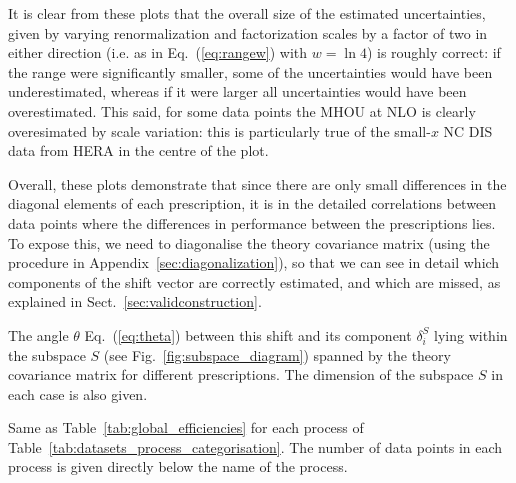 It is clear from these plots that the overall size of the estimated uncertainties, given by varying renormalization and factorization scales by a factor of two in either direction (i.e. as in 
Eq.~(\ref{eq:rangew}) with $w = \ln 4$) is roughly correct: if the range were significantly smaller, some of the uncertainties would have been underestimated, whereas if it were larger all uncertainties would have been overestimated. This said, for some data points the MHOU at NLO is clearly overesimated by scale variation: this is particularly true of the small-$x$ NC DIS data from HERA in the centre of the plot.
  
Overall, these plots demonstrate that since there are only small differences in the diagonal elements of each prescription, it is in the detailed correlations between data points where the differences in
performance between the prescriptions lies. To expose this, we need to diagonalise the theory covariance matrix (using the procedure in Appendix~\ref{sec:diagonalization}), so that we can see in detail which components of the shift vector are correctly estimated, and which are missed, as explained in Sect.~\ref{sec:validconstruction}. 


\begin{table}[ht!]
	\centering
	
        \vspace{5mm}
	\caption{\small The angle $\theta$  Eq.~(\ref{eq:theta}) between this
          shift and its component $\delta_i^S$ lying within the
          subspace $S$ (see Fig.~\ref{fig:subspace_diagram})
          spanned by the theory covariance matrix for  different
          prescriptions. The dimension of the subspace $S$ in each case
          is also given.}
	\label{tab:global_efficiencies}
\end{table}

\begin{table}[ht!]
	\centering
	\small
	
        \vspace{3mm}
	\caption{Same as Table~\ref{tab:global_efficiencies}
          for each process of Table~\ref{tab:datasets_process_categorisation}. The number of data points in each process is given directly below the name of the process.}
	\label{tab:process_efficiencies}
\end{table}

